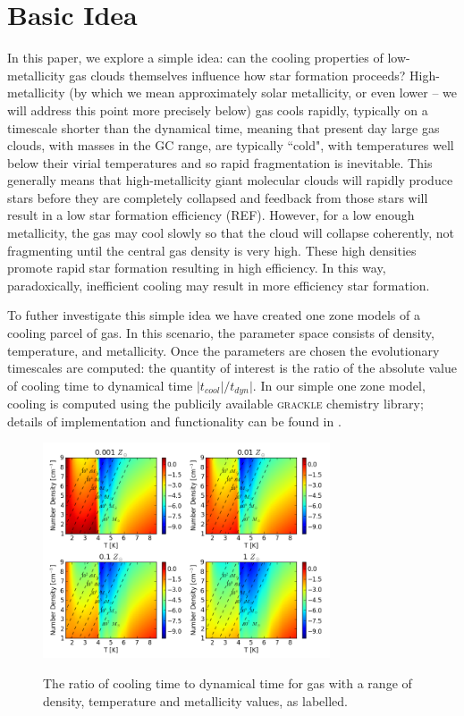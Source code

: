 \documentclass[useAMS,usenatbib]{mn2e}
\begin{document}
%
\section{Basic Idea}
\label{sec:basic}

In this paper, we explore a simple idea: can the cooling properties of low-metallicity gas clouds themselves influence how star formation proceeds?  High-metallicity (by which we mean approximately solar metallicity, or even lower -- we will address this point more precisely below) gas cools rapidly, typically on a timescale shorter than the dynamical time, meaning that present day large gas clouds, with masses in the GC range, are typically ``cold", with temperatures well below their virial temperatures and so rapid fragmentation is inevitable.  This generally means that high-metallicity giant molecular clouds will rapidly produce stars before they are completely collapsed and feedback from those stars will result in a low star formation efficiency (REF).  However, for a low enough metallicity, the gas may cool slowly so that the cloud will collapse coherently, not fragmenting until the central gas density is very high.  These high densities promote rapid star formation resulting in high efficiency.  In this way, paradoxically, inefficient cooling may result in more efficiency star formation.

To futher investigate this simple idea we have created one zone models of a cooling parcel of gas. In 
this scenario, the parameter space consists of density, temperature, and metallicity. Once the parameters
are chosen the evolutionary timescales are computed: the quantity of interest is the ratio of the absolute value of cooling
time to dynamical time $|t_{cool}|/t_{dyn}|$. In our simple one zone model, cooling is computed using the
publicily available \textsc{grackle} chemistry library; details of implementation and functionality can be found
in \cite{Bryan2013}.
\begin{figure}
\begin{center}
\mbox{\includegraphics[width=8.5cm]{Images/cooling_to_freefall_no_background}}
\end{center}
\caption{\label{fig:cooling_to_freefall}} The ratio of cooling time to dynamical time for gas with a range of density, temperature and metallicity values, as labelled.
\end{figure}
\end{document}
